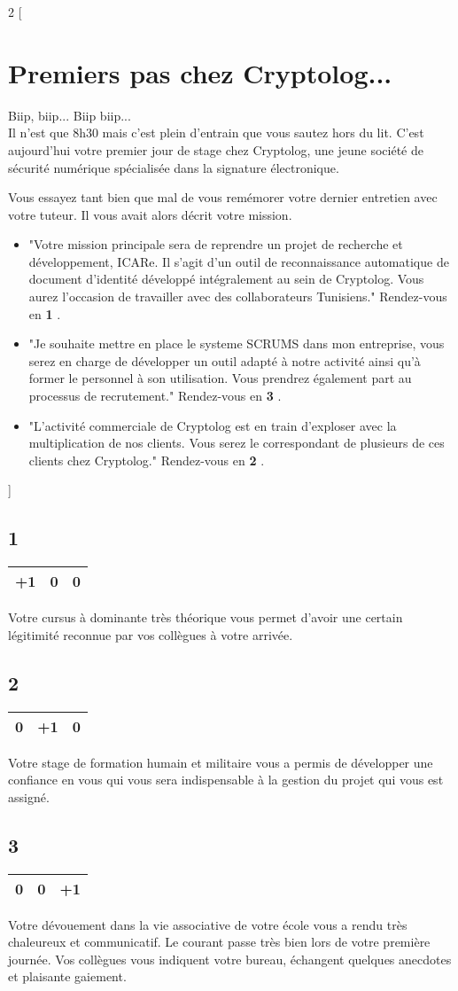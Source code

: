 \documentclass[12pt,a4paper,titlepage]{article}
\newcommand{\n}[1]{\textbf{#1} }
\newcommand{\update}[3]{
\begin{center}
\begin{tabular}{|c|c|c|}
\hline #1 & #2 & #3 \\ \hline
\end{tabular}
\end{center}
}
\begin{document}
\begin{multicols}{2}
[
\section{Premiers pas chez Cryptolog...}
Biip, biip... Biip biip... \\
Il n'est que 8h30 mais c'est plein d'entrain que vous sautez hors du lit. C'est aujourd'hui votre premier jour de stage chez Cryptolog, une jeune société de sécurité numérique spécialisée dans la signature électronique.

Vous essayez tant bien que mal de vous remémorer votre dernier entretien avec votre tuteur. Il vous avait alors décrit votre mission.
\begin{itemize}
\item "Votre mission principale sera de reprendre un projet de recherche et développement, ICARe. Il s'agit d'un outil de reconnaissance automatique de document d'identité développé intégralement au sein de Cryptolog. Vous aurez l'occasion de travailler avec des collaborateurs Tunisiens." Rendez-vous en \n{1}.
\item "Je souhaite mettre en place le systeme SCRUMS dans mon entreprise, vous serez en charge de développer un outil adapté à notre activité ainsi qu'à former le personnel à son utilisation. Vous prendrez également part au processus de recrutement." Rendez-vous en \n{3}.
\item "L'activité commerciale de Cryptolog est en train d'exploser avec la multiplication de nos clients. Vous serez le correspondant de plusieurs de ces clients chez Cryptolog." Rendez-vous en \n{2}.
\end{itemize}
]


\label{n1}
\subsection*{1}
\update{+1}{0}{0}
Votre cursus à dominante très théorique vous permet d'avoir une certain légitimité reconnue par vos collègues à votre arrivée.

\label{n2}
\subsection*{2}
\update{0}{+1}{0}
Votre stage de formation humain et militaire vous a permis de développer une confiance en vous qui vous sera indispensable à la gestion du projet qui vous est assigné.

\label{n3}
\subsection*{3}
\update{0}{0}{+1}
Votre dévouement dans la vie associative de votre école vous a rendu très chaleureux et communicatif. Le courant passe très bien lors de votre première journée. Vos collègues vous indiquent votre bureau, échangent quelques anecdotes et plaisante gaiement.


\end{multicols}
\end{document}

